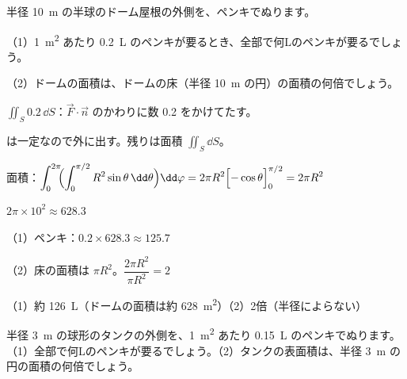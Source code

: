 \begin{reidai}
半径 \qty{10}{m} の半球のドーム屋根の外側を、ペンキでぬります。\par
（1）\qty{1}{m^2} あたり \qty{0.2}{L} のペンキが要るとき、全部で何Lのペンキが要るでしょう。\par
（2）ドームの面積は、ドームの床（半径 \qty{10}{m} の円）の面積の何倍でしょう。\par
\kangaekata {}\par
{}\enspace $\displaystyle\iint_S0.2\,\dd S$：$\vec F\cdot\vec n$ のかわりに数 0.2 をかけてたす。\par
{} は一定なので外に出す。残りは面積 $\iint_S\dd S$。\par
\shiki\kviiiis{}\zw{} 面積：$\displaystyle\int_0^{2\pi}\!\!\Bigl(\int_0^{\pi/2}R^2\sin\theta\,\dd\theta\Bigr)\dd\varphi=2\pi R^2\Bigl[-\cos\theta\Bigr]_0^{\pi/2}=2\pi R^2$\par
\kviiiia $2\pi\times10^2\approx628.3$\par
\kviiiia （1）ペンキ：$0.2\times628.3\approx125.7$\par
\kviiiia （2）床の面積は $\pi R^2$。$\dfrac{2\pi R^2}{\pi R^2}=2$\par
\kotae\kviiiis{}\zw{} （1）約 \qty{126}{L}（ドームの面積は約 \qty{628}{m^2}）\quad （2）2倍（半径によらない）
\end{reidai}

\begin{jibun}
半径 \qty{3}{m} の球形のタンクの外側を、\qty{1}{m^2} あたり \qty{0.15}{L} のペンキでぬります。（1）全部で何Lのペンキが要るでしょう。（2）タンクの表面積は、半径 \qty{3}{m} の円の面積の何倍でしょう。
\end{jibun}

